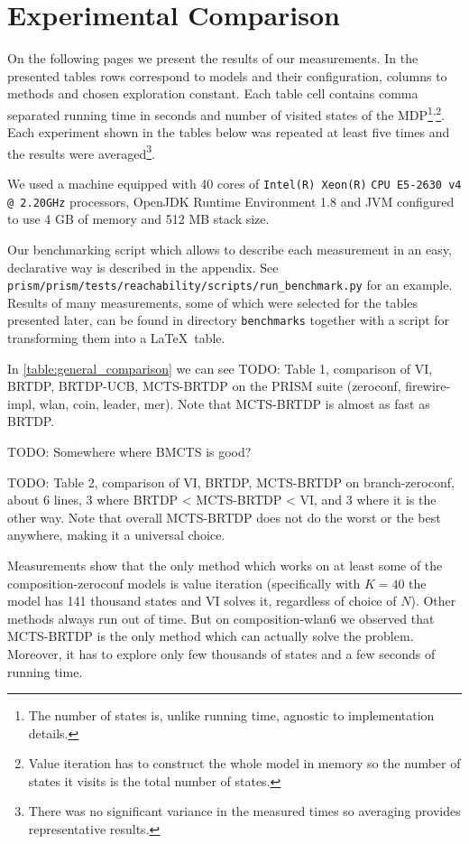 \section{Experimental Comparison}

On the following pages we present the results of our measurements.
In the presented tables rows correspond to models and their
configuration, columns to methods and chosen exploration constant.  Each
table cell contains comma separated running time in seconds and number of visited
states of the MDP\footnote{The number of states is, unlike running time,
agnostic to implementation details.}\textsuperscript{,}\footnote{Value iteration has to construct the
whole model in memory so the number of states it visits is the total
number of states.}. Each experiment shown in the tables below was repeated
at least five times and the results were averaged\footnote{There was no
significant variance in the measured times so averaging provides
representative results.}.

We used a machine equipped with
40 cores of \verb|Intel(R) Xeon(R)| \verb|CPU E5-2630 v4 @ 2.20GHz| processors,
OpenJDK Runtime Environment 1.8 and JVM configured to use 4 GB of memory
and 512 MB stack size.

Our benchmarking script which allows to describe each measurement
in an easy, declarative way is described in the appendix. See
\verb|prism/prism/tests/reachability/scripts/run_benchmark.py| for
\linebreak an example.
Results of many measurements, some of which were selected for the tables
presented later, can be found in directory \linebreak \verb|benchmarks| together
with a script for transforming them into a \LaTeX\ table.

In \autoref{table:general_comparison} we can see
TODO: Table 1, comparison of VI, BRTDP, BRTDP-UCB, MCTS-BRTDP on the
PRISM suite (zeroconf, firewire-impl, wlan, coin, leader, mer).
Note that MCTS-BRTDP is almost as fast as BRTDP.

TODO: Somewhere where BMCTS is good?

TODO: Table 2, comparison of VI, BRTDP, MCTS-BRTDP on branch-zeroconf,
about 6 lines, 3 where BRTDP < MCTS-BRTDP < VI, and 3 where it is the
other way.
Note that overall MCTS-BRTDP does
not do the worst or the best anywhere, making it a universal choice.

Measurements show that the only method which works on at least some of the
composition-zeroconf models is value iteration (specifically with $K = 40$ the
model has 141 thousand states and VI solves it, regardless of choice of $N$).
Other methods always run out of time.
But on composition-wlan6 we observed that MCTS-BRTDP is the only method which
can actually solve the problem. Moreover, it has to explore only few
thousands of states and a few seconds of running time.

